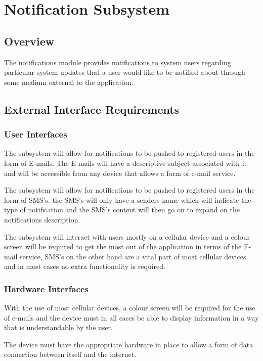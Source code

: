 \documentclass{article}
\begin{document}
    
    \section{Notification Subsystem}
    
    \subsection{Overview}
    The notifications module provides notifications to system users regarding
    particular system updates that a user would like to be notified about through
    some medium external to the application.
    
    \subsection{External Interface Requirements}
    
    \subsubsection{User Interfaces}
    
    The subsystem will allow for notifications to be pushed to registered users in the form of E-mails. The E-mails will have a descriptive subject associated with it and will be accessible from any device that allows a form of e-mail service.
    \newline
    \begin{flushleft}
    

    The subsystem will allow for notifications to be pushed to registered users in the form of SMS's. the SMS's will only have a senders name which will indicate the type of notification and the SMS's content will then go on to expand on the notifications description.
    \newline
      
    
    The subsystem will interact with users mostly on a cellular device and a colour screen will be required to get the most out of the application in terms of the E-mail service, SMS's on the other hand are a vital part of most cellular devices and in most cases no extra functionality is required.
   	\newline
   	  \end{flushleft}
   	\subsubsection{Hardware Interfaces}
    \begin{flushleft}
    With the use of most cellular devices, a colour screen will be required for the use of e-mails and the device must in all cases be able to display information in a way that is understandable by the user.
    
    The device must have the appropriate hardware in place to allow a form of data connection between itself and the internet.
    \end{flushleft}
	
\end{document}
